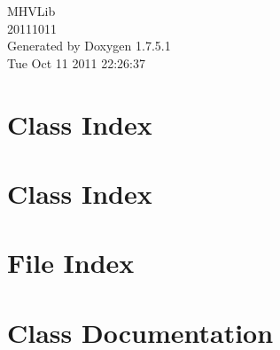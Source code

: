 \documentclass[a4paper]{book}
\begin{document}
\hypersetup{pageanchor=false,citecolor=blue}
\begin{titlepage}
\vspace*{7cm}
\begin{center}
{\Large \-M\-H\-V\-Lib \\[1ex]\large 20111011 }\\
\vspace*{1cm}
{\large \-Generated by Doxygen 1.7.5.1}\\
\vspace*{0.5cm}
{\small Tue Oct 11 2011 22:26:37}\\
\end{center}
\end{titlepage}
\clearemptydoublepage
{}
\tableofcontents
\clearemptydoublepage
{}
\hypersetup{pageanchor=true,citecolor=blue}
\chapter{\-Class \-Index}

\chapter{\-Class \-Index}

\chapter{\-File \-Index}

\chapter{\-Class \-Documentation}




































\end{document}
